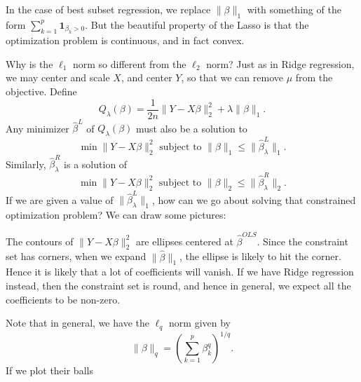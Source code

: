 \documentclass[a4paper]{article}
\begin{document}
In the case of best subset regression, we replace $\|\beta\|_1$ with something of the form $\sum_{k = 1}^p \mathbf{1}_{\beta_k > 0}$. But the beautiful property of the Lasso is that the optimization problem is continuous, and in fact convex.

Why is the $\ell_1$ norm so different from the $\ell_2$ norm? Just as in Ridge regression, we may center and scale $X$, and center $Y$, so that we can remove $\mu$ from the objective. Define
\[
  Q_\lambda(\beta) = \frac{1}{2n} \|Y - X \beta\|_2^2 + \lambda \|\beta\|_1.
\]
Any minimizer $\hat{\beta}^L$ of $Q_\lambda(\beta)$ must also be a solution to
\[
  \min \|Y - X \beta\|_2^2 \text{ subject to } \|\beta\|_1 \leq \|\hat{\beta}_\lambda^L\|_1.
\]
Similarly, $\hat{\beta}_\lambda^R$ is a solution of
\[
  \min \|Y - X \beta\|_2^2 \text{ subject to } \|\beta\|_2 \leq \|\hat{\beta}_\lambda^R\|_2.
\]
If we are given a value of $\|\hat{\beta}_\lambda^L\|_1$, how can we go about solving that constrained optimization problem? We can draw some pictures:
\begin{center}
\end{center}
The contours of $\|Y - X \beta\|_2^2$ are ellipses centered at $\hat{\beta}^{OLS}$. Since the constraint set has corners, when we expand $\|\hat{\beta}\|_1$, the ellipse is likely to hit the corner. Hence it is likely that a lot of coefficients will vanish. If we have Ridge regression instead, then the constraint set is round, and hence in general, we expect all the coefficients to be non-zero.


Note that in general, we have the $\ell_q$ norm given by
\[
  \|\beta\|_q = \left(\sum_{k = 1}^p \beta_k^q\right)^{1/q}.
\]
If we plot their balls
\end{document}
